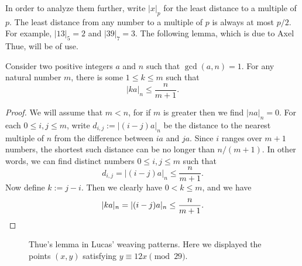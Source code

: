 In order to analyze them further, write $|x|_p$ for the least distance to a multiple of $p$. The least distance from any number to a multiple of $p$ is always at most $p/2$. For example, $|13|_5=2$ and $|39|_7=3$. The following lemma, which is due to Axel Thue, will be of use.

\begin{lemma}\label{lemma:thues-lemma}
  Consider two positive integers $a$ and $n$ such that $\gcd(a,n)=1$. For any natural number $m$, there is some $1\leq k\leq m$ such that
  \begin{equation*}
    |ka|_n\leq\frac{n}{m+1}.
  \end{equation*}
\end{lemma}

\begin{proof}
  We will assume that $m<n$, for if $m$ is greater then we find $|na|_n=0$. For each $0\leq i,j\leq m$, write $d_{i,j}:=|(i-j)a|_n$ be the distance to the nearest multiple of $n$ from the difference between $ia$ and $ja$. Since $i$ ranges over $m+1$ numbers, the shortest such distance can be no longer than $n/(m+1)$. In other words, we can find distinct numbers $0\leq i,j\leq m$ such that
  \begin{equation*}
    d_{i,j}=|(i-j)a|_n\leq \frac{n}{m+1}.
  \end{equation*}
  Now define $k:=j-i$. Then we clearly have $0<k\leq m$, and we have
  \begin{equation*}
    |ka|_n=|(i-j)a|_n\leq \frac{n}{m+1}.\qedhere
  \end{equation*}
\end{proof}

\begin{figure}[t]
  \centering
  \def\cellsize{3mm}

  \caption[Thue's lemma in Lucas' weaving patterns]{Thue's lemma in Lucas' weaving patterns. Here we displayed the points $(x,y)$ satisfying $y\equiv 12x\pmod{29}$.}
  \label{figure:thue-weaving-pattern}
\end{figure}

